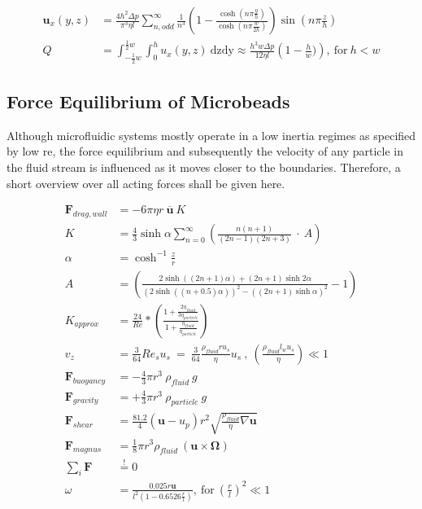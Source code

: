   \begin{align}
\mathbf{u}   _x(y,z) &= \frac{4 h^2 \Delta p}{\pi^3 \eta l} \sum_{n,odd}^{\infty} \frac{1}{n^3} \left( 1- \frac{\cosh (n \pi \frac{y}{h})}{\cosh (n \pi \frac{w}{2h})} \right) \sin (n \pi \frac{z}{h}) \label{eq:flowVelocityRect} \\
  Q    &= \int_{-\frac{1}{2}w}^{\frac{1}{2}w} \int_{0}^{h} u   _x(y,z) \ \mathrm{dzdy} \approx \frac{h^3 w \Delta p}{12 \eta l} \left( 1 - \frac{h}{w}) \right) \label{eq:flowRateRect} \mathrm{, \ for \ } h < w
\end{align}


\subsection{Force Equilibrium of Microbeads}
Although microfluidic systems mostly operate in a low inertia regimes as specified by low \gls{re}, the force equilibrium and subsequently the velocity of any particle in the fluid stream is influenced as it moves closer to the boundaries. Therefore, a short overview over all acting forces shall be given here.


\begin{align}
	\mathbf{F}_{drag,wall} &= -6 \pi \eta r \ \overline{\mathbf{u}} \ K \label{eq:f:drag}\\
	K &=  \frac{4}{3} \sinh \alpha \sum_{n=0}^{\infty} \left(\frac{n(n+1)}{(2n-1)(2n+3)} \ \cdot \ A \right) \label{eq:f:wall-correction}\\
	\alpha &= \cosh^{-1}\frac{z}{r} \\
	A &= \left(\frac{2 \sinh((2n+1)\alpha) + (2n+1)\sinh2\alpha}{(2\sinh((n+0.5)\alpha))^2 -((2n+1)\sinh\alpha)^2 }-1\right)\\
	K_{approx} &= \frac{24}{\mathit{Re}} *\left(\frac{1+\frac{2\eta_{fluid}}{3 \eta_{particle}}}{1+\frac{\eta_{fluid}}{ \eta_{particle}}}\right) \label{eq:correctionApprox}\\
	v_z &= \frac{3}{64} \mathit{Re}_s u_s \ = \ \frac{3}{64} \frac{\rho_{fluid} r u_s}{\eta} u_s \ , \ (\frac{\rho_{fluid} l_w u_s}{\eta}) \ll 1\label{eq:repulsion_v}\\
	\mathbf{F}_{buoyancy} &= -\frac{4}{3}\pi r^3 \ \rho_{fluid} \ g \label{eq:f:buoyancy}\\
	\mathbf{F}_{gravity} &= +\frac{4}{3}\pi r^3 \ \rho_{particle} \ g \label{eq:f:grav}\\
	\mathbf{F}_{shear} &= \frac{81.2}{4} (\mathbf{u} - u_p) r^2 \sqrt{\frac{\rho_{fluid}}{\eta} \nabla \mathbf{u}} \\
	\mathbf{F}_{magnus} &=  \frac{1}{8}\pi r^3 \rho_{fluid} \ ( \mathbf{u} \times \mathbf{\Omega} )\\
	\sum_{i} \mathbf{F} &\overset{!}{=} 0 \\
	\omega &= \frac{0.025r \mathbf{u}}{l^2(1-0.6526\frac{r}{l})} \mathrm{, \ for \ } (\frac{r}{l})^2 \ll 1	
\end{align}

